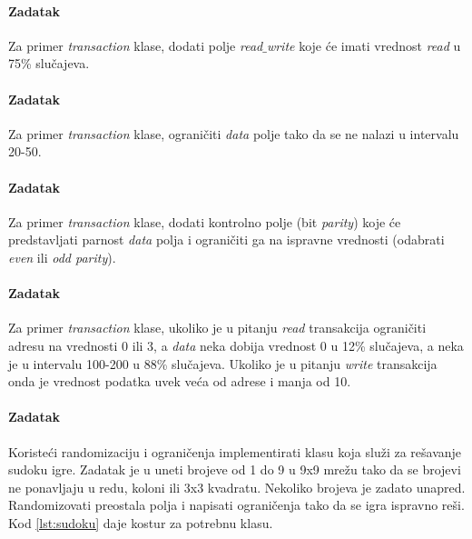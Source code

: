 \paragraph{Zadatak}

Za primer \emph{transaction} klase, dodati polje \emph{read\(\_\)write} koje će
imati vrednost \emph{read} u 75\% slučajeva.

\paragraph{Zadatak}

Za primer \emph{transaction} klase, ograničiti \emph{data} polje tako da se ne
nalazi u intervalu 20-50.

\paragraph{Zadatak}

Za primer \emph{transaction} klase, dodati kontrolno polje (bit \emph{parity})
koje će predstavljati parnost \emph{data} polja i ograničiti ga na ispravne
vrednosti (odabrati \emph{even} ili \emph{odd parity}).

\paragraph{Zadatak}

Za primer \emph{transaction} klase, ukoliko je u pitanju \emph{read} transakcija
ograničiti adresu na vrednosti 0 ili 3, a \emph{data} neka dobija vrednost 0 u
12\% slučajeva, a neka je u intervalu 100-200 u 88\% slučajeva. Ukoliko je u
pitanju \emph{write} transakcija onda je vrednost podatka uvek veća od adrese i
manja od 10.

\paragraph{Zadatak}

Koristeći randomizaciju i ograničenja implementirati klasu koja služi za
rešavanje sudoku igre. Zadatak je u uneti brojeve od 1 do 9 u 9x9 mrežu tako da
se brojevi ne ponavljaju u redu, koloni ili 3x3 kvadratu. Nekoliko brojeva je
zadato unapred. Randomizovati preostala polja i napisati ograničenja tako da se
igra ispravno reši. Kod \ref{lst:sudoku} daje kostur za potrebnu klasu.




